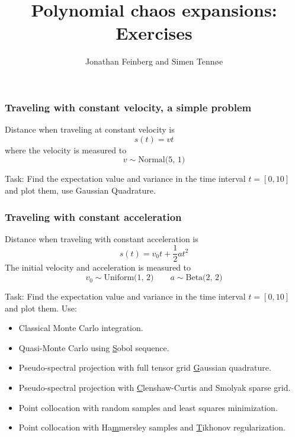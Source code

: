 \documentclass{beamer}
\title{Polynomial chaos expansions: Exercises}
\author{Jonathan Feinberg and Simen Tennøe}
\begin{document}
\begin{frame}
  \maketitle
\end{frame}


\begin{frame}
\frametitle{Traveling with constant velocity, a simple problem}
 Distance when traveling at constant velocity is
\[s(t) = vt\]
\pause
where the velocity is measured to
\[v \sim \text{Normal(5, 1)}\]
\pause
\begin{alert}{Task:}
 Find the expectation value and variance in the time interval $t=[0,10]$  and plot them, use Gaussian Quadrature.
\end{alert}

\end{frame}

\begin{frame}
\frametitle{Traveling with constant acceleration}
\scriptsize
 Distance when traveling with constant acceleration is
 \[s(t) = v_0t + \frac{1}{2}at^2\]
\pause
The initial velocity and acceleration is measured to
\[v_0 \sim \text{Uniform(1, 2)} \qquad a \sim \text{Beta(2, 2)}\]
\pause
\begin{alert}{Task:}
Find the expectation value and variance in the time interval $t=[0,10]$  and plot them. Use:
\begin{itemize}
    \item Classical Monte Carlo integration.
    \item Quasi-Monte Carlo using \underline{S}obol sequence.
    \item Pseudo-spectral projection with full tensor grid \underline{G}aussian quadrature.
    \item Pseudo-spectral projection with \underline{C}lenshaw-Curtis and Smolyak sparse grid.
    \item Point collocation with random samples and least squares
        minimization.
    \item Point collocation with Ha\underline{m}mersley samples and \underline{T}ikhonov regularization.
\end{itemize}
\end{alert}
\end{frame}

\end{document}
